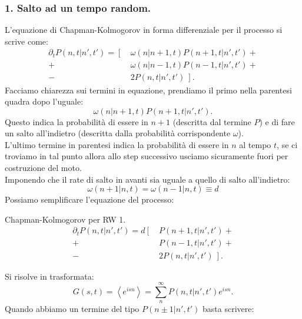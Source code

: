 \subsubsection{1. Salto ad un tempo random.}%
\label{subsub:1. Salto ad un tempo random.}
L'equazione di Chapman-Kolmogorov in forma differenziale per il processo si scrive come:
\[\begin{aligned}
    \partial_{t}P\left(n,t|n',t'\right) = \left[ \ \right.&\omega\left(n|n+1,t\right)P\left(n+1, t|n',t'\right) +\\
                                             +& \omega\left(n|n-1,t\right)P\left(n-1, t|n',t'\right) + \\
					     -& \left. 2P\left(n,t|n',t'\right) \ \right]
.\end{aligned}\]
Facciamo chiarezza sui termini in equazione, prendiamo il primo nella parentesi quadra dopo l'uguale:
\[
    \omega\left(n|n+1,t\right)P\left(n+1, t|n',t'\right)
.\] 
Questo indica la probabilità di essere in $n+1$ (descritta dal termine $P$) e di fare un salto all'indietro (descritta dalla probabilità corrispondente $\omega$).\\
L'ultimo termine in parentesi indica la probabilità di essere in $n$ al tempo $t$, se ci troviamo in tal punto allora allo step successivo usciamo sicuramente fuori per costruzione del moto.\\
Imponendo che il rate di salto in avanti sia uguale a quello di salto all'indietro:
\begin{equation}
    \omega (n+1|n,t) = \omega (n-1|n,t) \equiv d \label{6_rate}
\end{equation}
Possiamo semplificare l'equazione del processo:
\begin{bluebox}{Chapman-Kolmogorov per RW 1.}
    \begin{equation}
\begin{aligned}
    \partial_{t}P\left(n,t|n',t'\right) = d\left[ \ \right.&P\left(n+1, t|n',t'\right) +\\
                                             +& P\left(n-1, t|n',t'\right) + \\
					     -& \left. 2P\left(n,t|n',t'\right) \ \right]
					     \label{eq:RW_1}
.\end{aligned}
    \end{equation}
\end{bluebox}
\noindent
Si risolve in trasformata:
\[
    G(s,t) = \left<e^{isn}\right> = \sum_{n}^{\infty} P\left(n,t|n',t'\right)e^{isn}
.\] 
Quando abbiamo un termine del tipo $P\left(n\pm 1|n',t'\right)$ basta scrivere:
